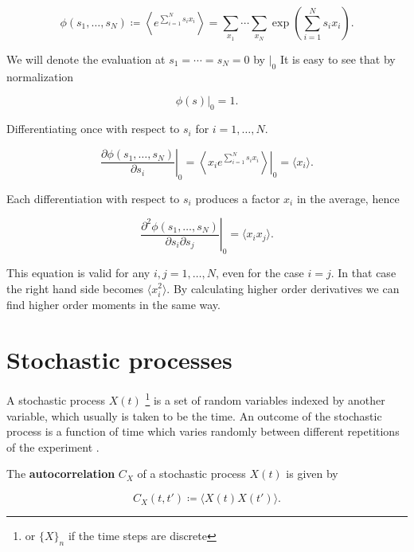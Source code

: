 \begin{equation*}
  \phi(s_1,\dotsc,s_N)\coloneqq \left\langle e^{\sum_{i=1}^Ns_ix_i}\right\rangle = \sum_{x_1}\dotsi\sum_{x_N}\exp\left(\sum_{i=1}^Ns_ix_i\right).
\end{equation*}

We will denote the evaluation at $s_1=\dotsb=s_N=0$ by $|_0$ It is easy to see that by normalization

\begin{equation*}
  \phi(s)|_0 = 1.
\end{equation*}

Differentiating once with respect to $s_i$ for $i=1,\dotsc,N$.

\begin{equation}
  \label{eq:con-char_1}
  \left.\frac{\partial\phi(s_1,\dotsc,s_N)}{\partial s_i}\right|_0 = \left.\left\langle x_i e^{\sum_{i=1}^Ns_ix_i}\right\rangle\right|_0 = \langle x_i\rangle.
\end{equation}

Each differentiation with respect to $s_i$ produces a factor $x_i$ in the average, hence

\begin{equation}
  \label{eq:con-char_2}
  \left.\frac{\partial^2\phi(s_1,\dotsc,s_N)}{\partial s_i \partial s_j}\right|_0 = \langle x_ix_j\rangle.
\end{equation}

This equation is valid for any $i,j=1,\dotsc,N$, even for the case $i=j$. In that case the right hand side becomes $\langle x_i^2\rangle$. By calculating higher order derivatives we can find higher order moments in the same way.
  
\section{Stochastic processes}

A stochastic process $X(t)$ \footnote{or $\{X\}_n$ if the time steps are discrete} is a set of random variables indexed by another variable, which usually is taken to be the time. An outcome of the stochastic process is a function of time which varies randomly between different repetitions of the experiment \cite{vankampen92} \cite{gardiner03}.

The \textbf{autocorrelation} $C_X$ of a stochastic process $X(t)$ is given by

\begin{equation*}
  C_X(t,t') \coloneqq \langle X(t)X(t')\rangle.
\end{equation*}

